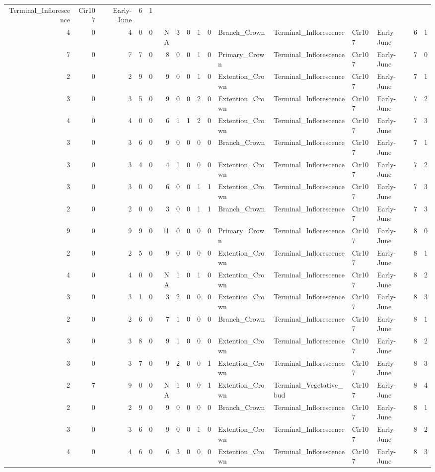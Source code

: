 \documentclass[]{article}
\begin{document}
\begin{longtable}[]{@{}rrrrrrrrrrllllrl@{}}
Terminal\_Inflorescence & Cir107 & Early-June & 6 & 1\tabularnewline
4 & 0 & 4 & 0 & 0 & NA & 3 & 0 & 1 & 0 & Branch\_Crown &
Terminal\_Inflorescence & Cir107 & Early-June & 6 & 1\tabularnewline
7 & 0 & 7 & 7 & 0 & 8 & 0 & 0 & 1 & 0 & Primary\_Crown &
Terminal\_Inflorescence & Cir107 & Early-June & 7 & 0\tabularnewline
2 & 0 & 2 & 9 & 0 & 9 & 0 & 0 & 1 & 0 & Extention\_Crown &
Terminal\_Inflorescence & Cir107 & Early-June & 7 & 1\tabularnewline
3 & 0 & 3 & 5 & 0 & 9 & 0 & 0 & 2 & 0 & Extention\_Crown &
Terminal\_Inflorescence & Cir107 & Early-June & 7 & 2\tabularnewline
4 & 0 & 4 & 0 & 0 & 6 & 1 & 1 & 2 & 0 & Extention\_Crown &
Terminal\_Inflorescence & Cir107 & Early-June & 7 & 3\tabularnewline
3 & 0 & 3 & 6 & 0 & 9 & 0 & 0 & 0 & 0 & Branch\_Crown &
Terminal\_Inflorescence & Cir107 & Early-June & 7 & 1\tabularnewline
3 & 0 & 3 & 4 & 0 & 4 & 1 & 0 & 0 & 0 & Extention\_Crown &
Terminal\_Inflorescence & Cir107 & Early-June & 7 & 2\tabularnewline
3 & 0 & 3 & 0 & 0 & 6 & 0 & 0 & 1 & 1 & Extention\_Crown &
Terminal\_Inflorescence & Cir107 & Early-June & 7 & 3\tabularnewline
2 & 0 & 2 & 0 & 0 & 3 & 0 & 0 & 1 & 1 & Branch\_Crown &
Terminal\_Inflorescence & Cir107 & Early-June & 7 & 3\tabularnewline
9 & 0 & 9 & 9 & 0 & 11 & 0 & 0 & 0 & 0 & Primary\_Crown &
Terminal\_Inflorescence & Cir107 & Early-June & 8 & 0\tabularnewline
2 & 0 & 2 & 5 & 0 & 9 & 0 & 0 & 0 & 0 & Extention\_Crown &
Terminal\_Inflorescence & Cir107 & Early-June & 8 & 1\tabularnewline
4 & 0 & 4 & 0 & 0 & NA & 1 & 0 & 1 & 0 & Extention\_Crown &
Terminal\_Inflorescence & Cir107 & Early-June & 8 & 2\tabularnewline
3 & 0 & 3 & 1 & 0 & 3 & 2 & 0 & 0 & 0 & Extention\_Crown &
Terminal\_Inflorescence & Cir107 & Early-June & 8 & 3\tabularnewline
2 & 0 & 2 & 6 & 0 & 7 & 1 & 0 & 0 & 0 & Branch\_Crown &
Terminal\_Inflorescence & Cir107 & Early-June & 8 & 1\tabularnewline
3 & 0 & 3 & 8 & 0 & 9 & 1 & 0 & 0 & 0 & Extention\_Crown &
Terminal\_Inflorescence & Cir107 & Early-June & 8 & 2\tabularnewline
3 & 0 & 3 & 7 & 0 & 9 & 2 & 0 & 0 & 1 & Extention\_Crown &
Terminal\_Inflorescence & Cir107 & Early-June & 8 & 3\tabularnewline
2 & 7 & 9 & 0 & 0 & NA & 1 & 0 & 0 & 1 & Extention\_Crown &
Terminal\_Vegetative\_bud & Cir107 & Early-June & 8 & 4\tabularnewline
2 & 0 & 2 & 9 & 0 & 9 & 0 & 0 & 0 & 0 & Branch\_Crown &
Terminal\_Inflorescence & Cir107 & Early-June & 8 & 1\tabularnewline
3 & 0 & 3 & 6 & 0 & 9 & 0 & 0 & 1 & 0 & Extention\_Crown &
Terminal\_Inflorescence & Cir107 & Early-June & 8 & 2\tabularnewline
4 & 0 & 4 & 6 & 0 & 6 & 3 & 0 & 0 & 0 & Extention\_Crown &
Terminal\_Inflorescence & Cir107 & Early-June & 8 & 3\tabularnewline

\end{longtable}
\end{document}
